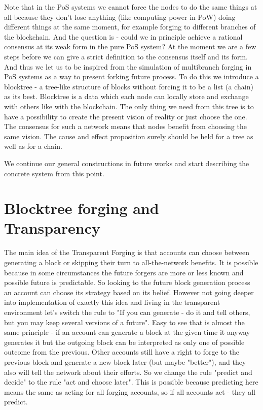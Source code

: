 \documentclass[12pt]{article}
\begin{document}
Note that in the PoS systems we cannot force the nodes to do the same things at all because they don't lose anything (like computing power in PoW) doing 
different things at the same moment, for example forging to different branches of the blockchain. And the question is \-- could we in principle achieve a rational
consensus at its weak form in the pure PoS system? At the moment we are a few steps before we can give a strict definition to the consensus itself and its form. 
And thus we let us to be inspired from the simulation of multibranch forging in PoS systems as a way to present forking future process. 
To do this we introduce a blocktree \-- a tree-like structure of blocks without 
forcing it to be a list (a chain) as its best. Blocktree is a data which each node can locally store and exchange with others like with the blockchain. 
The only thing we need from this tree is to have a possibility to create the present vision of reality or just choose the one. 
The consensus for such a network means that nodes benefit from choosing the same vision. The cause
and effect proposition surely should be held for a tree as well as for a chain. 

We continue our general constructions in future works and start describing the concrete system from this point.

\section{Blocktree forging and Transparency}
The main idea of the Transparent Forging is that accounts can choose between generating a block or skipping 
their turn to all-the-network benefits. 
It is possible because in some circumstances the future forgers are more or less known and possible future is predictable. So looking to the future block generation
process an account can choose its strategy based on its belief. However not going deeper into implementation of exactly this idea and living in the 
transparent environment let's switch the rule to "If you can generate - do it and tell others, but you may keep several versions of a future". Easy to see
that is almost the same principle \-- if an account can generate a block at the given time it anyway generates it but the outgoing block 
can be interpreted as only one of possible outcome from the previous. Other accounts still have a right to forge to the previous block and generate a new block later (but maybe "better"), and they also will tell the 
network about their efforts. So we change the rule "predict and decide" to the rule "act and choose later". This is possible because predicting here means the
same as acting for all forging accounts, so if all accounts act \-- they all predict. 
\end{document}
